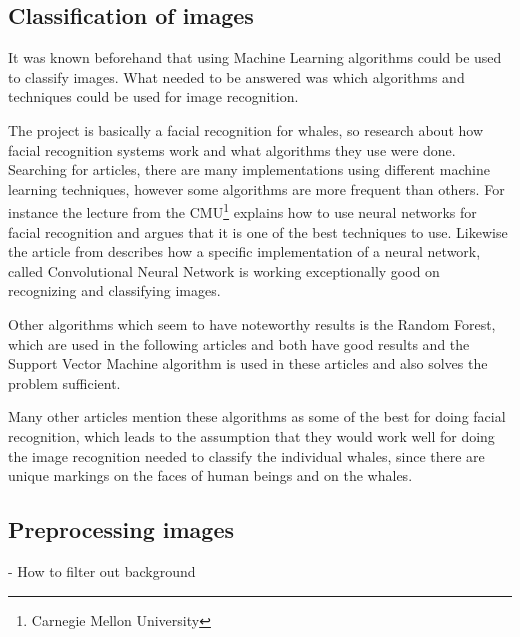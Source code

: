 \subsection{Classification of images}
It was known beforehand that using Machine Learning algorithms could be used to classify images. What needed to be answered was which algorithms and techniques could be used for image recognition. 

The project is basically a facial recognition for whales, so research about how facial recognition systems work and what algorithms they use were done. Searching for articles, there are many implementations using different machine learning techniques, however some algorithms are more frequent than others. For instance the lecture from the CMU\footnote{Carnegie Mellon University} \cite{lit:nn1} explains how to use neural networks for facial recognition and argues that it is one of the best techniques to use. Likewise the article from \cite{lit:nn2} describes how a specific implementation of a neural network, called Convolutional Neural Network is working exceptionally good on recognizing and classifying images. 

Other algorithms which seem to have noteworthy results is the Random Forest, which are used in the following articles \cite{lit:rn1} and \cite{lit:rn2} both have good results and the Support Vector Machine algorithm is used in these articles \cite{lit:svm1} and \cite{lit:svm2} also solves the problem sufficient.

Many other articles mention these algorithms as some of the best for doing facial recognition, which leads to the assumption that they would work well for doing the image recognition needed to classify the individual whales, since there are unique markings on the faces of human beings and on the whales.





\subsection{Preprocessing images}
\label{sec:litterature}
- How to filter out background